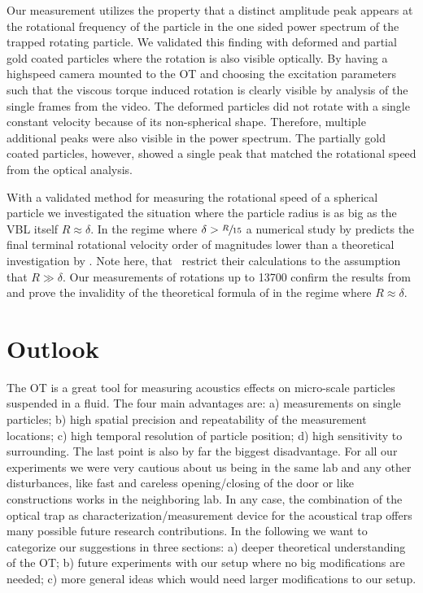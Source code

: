Our measurement utilizes the property that a distinct amplitude peak appears at 
the rotational frequency of the particle in the one sided power spectrum of the 
trapped rotating particle. We validated this finding with deformed and partial 
gold coated particles where the rotation is also visible optically. By having a 
highspeed camera mounted to the OT and choosing the excitation parameters such 
that the viscous torque induced rotation is clearly visible by analysis of the 
single frames from the video. The deformed particles did not rotate with a 
single constant velocity because of its non-spherical shape. Therefore, 
multiple additional peaks were also visible in the power spectrum. The 
partially gold coated particles, however, showed a single peak that matched the 
rotational speed from the optical analysis.

With a validated method for measuring the rotational speed of a spherical 
particle we investigated the situation where the particle radius is as big as 
the VBL itself $R\approx\delta$. In the regime where $\delta 
> \sfrac{R}{15}$ a numerical study by  predicts the final 
terminal rotational velocity order of magnitudes lower than a theoretical 
investigation by . Note here, that~\cite{Lamprecht2015} 
restrict their calculations to the assumption that $R\gg\delta$. Our 
measurements of rotations up to \SI{13700}{\rpm} confirm the results from 
 and prove the invalidity of the theoretical formula of 
 in the regime where $R\approx\delta$.

\section{Outlook}

The OT is a great tool for measuring acoustics effects on micro-scale particles 
suspended in a fluid. The four main advantages are: a) measurements on single 
particles; b) high spatial precision and repeatability of the measurement 
locations; c) high temporal resolution of particle position; d) high 
sensitivity to surrounding. The last point is also by far the biggest 
disadvantage. For all our experiments we were very cautious about us being in 
the same lab and any other disturbances, like fast and careless opening/closing 
of the door or like constructions works in the neighboring lab. In any case, 
the combination of the optical trap as characterization/measurement device for 
the acoustical trap offers many possible future research contributions. In the 
following we want to categorize our suggestions in three sections: a) deeper 
theoretical understanding of the OT; b) future experiments with our setup where 
no big modifications are needed; c) more general ideas which would need larger 
modifications to our setup.

